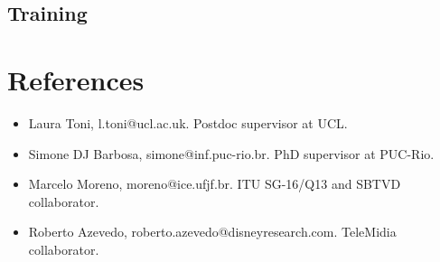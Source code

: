 \documentclass[10pt,a4paper,sans,colorlinks]{moderncv}
\begin{document}
\subsection{Training}

\section{References}

\begin{itemize}[mynosep]
  \item Laura Toni, l.toni@ucl.ac.uk. Postdoc supervisor at UCL.
  \item Simone DJ Barbosa, simone@inf.puc-rio.br. PhD supervisor at PUC-Rio.
  \item Marcelo Moreno, moreno@ice.ufjf.br. ITU SG-16/Q13 and SBTVD collaborator.
  \item Roberto Azevedo, roberto.azevedo@disneyresearch.com. TeleMidia collaborator.
\end{itemize}
\end{document}
